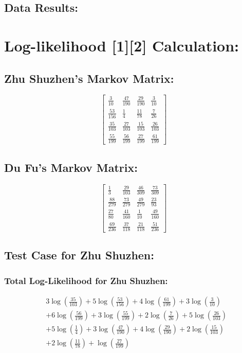 \documentclass[12pt]{article}
\begin{document}
\newpage

\subsection{Data Results: }

\section*{Log-likelihood [1][2] Calculation: }

\subsection*{Zhu Shuzhen's Markov Matrix:}

\[
\begin{bmatrix}
\frac{3}{10} & \frac{47}{190} & \frac{29}{190} & \frac{3}{10} \\
\frac{53}{156} & \frac{1}{4} & \frac{11}{78} & \frac{7}{26} \\
\frac{35}{103} & \frac{27}{103} & \frac{15}{103} & \frac{26}{103} \\
\frac{55}{199} & \frac{56}{199} & \frac{27}{199} & \frac{61}{199}
\end{bmatrix}
\]

\subsection*{Du Fu's Markov Matrix:}

\[
\begin{bmatrix}
\frac{1}{3} & \frac{29}{103} & \frac{46}{309} & \frac{73}{309} \\
\frac{88}{279} & \frac{73}{279} & \frac{49}{279} & \frac{23}{93} \\
\frac{27}{80} & \frac{41}{160} & \frac{1}{10} & \frac{49}{160} \\
\frac{69}{236} & \frac{37}{118} & \frac{21}{118} & \frac{51}{236}
\end{bmatrix}
\]

\subsection*{Test Case for Zhu Shuzhen: }

\subsubsection*{Total Log-Likelihood for Zhu Shuzhen:}

\begin{align*}
& 3 \log\left(\frac{35}{103}\right) + 5 \log\left(\frac{53}{156}\right) + 4 \log\left(\frac{61}{199}\right) + 3 \log\left(\frac{3}{10}\right) \\
& + 6 \log\left(\frac{56}{199}\right) + 3 \log\left(\frac{55}{199}\right) + 2 \log\left(\frac{7}{26}\right) + 5 \log\left(\frac{26}{103}\right) \\
& + 5 \log\left(\frac{1}{4}\right) + 3 \log\left(\frac{47}{190}\right) + 4 \log\left(\frac{29}{190}\right) + 2 \log\left(\frac{15}{103}\right) \\
& + 2 \log\left(\frac{11}{78}\right) + \log\left(\frac{27}{199}\right)
\end{align*}
\end{document}
